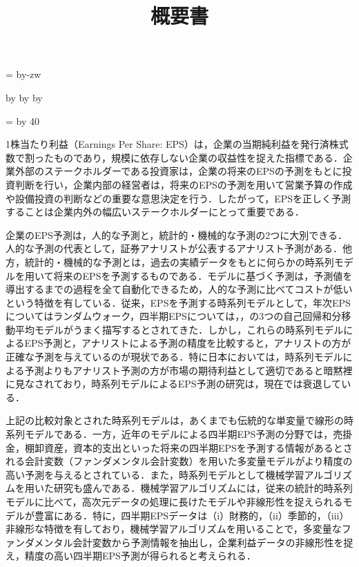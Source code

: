 \documentclass[a4paper，11pt]{jsarticle}
\title{概要書}
\date{}
\makeatletter
\def\mojiparline#1{
    \newcounter{mpl}
    \setcounter{mpl}{#1}
    \@tempdima=\linewidth
    \advance\@tempdima by-\value{mpl}zw
    \addtocounter{mpl}{-1}
    \divide\@tempdima by \value{mpl}
    \advance\kanjiskip by\@tempdima
    \advance\parindent by\@tempdima
}
\def\linesparpage#1{
    \baselineskip=\textheight
    \divide\baselineskip by #1
}
\makeatother
\begin{document}
\mojiparline{35}
\linesparpage{40}

\pagestyle{empty}

\maketitle


1株当たり利益（Earnings Per Share: EPS）は，企業の当期純利益を発行済株式数で割ったものであり，規模に依存しない企業の収益性を捉えた指標である．企業外部のステークホルダーである投資家は，企業の将来のEPSの予測をもとに投資判断を行い，企業内部の経営者は，将来のEPSの予測を用いて営業予算の作成や設備投資の判断などの重要な意思決定を行う．したがって，EPSを正しく予測することは企業内外の幅広いステークホルダーにとって重要である．

企業のEPS予測は，人的な予測と，統計的・機械的な予測の2つに大別できる．人的な予測の代表として，証券アナリストが公表するアナリスト予測がある．他方，統計的・機械的な予測とは，過去の実績データをもとに何らかの時系列モデルを用いて将来のEPSを予測するものである．モデルに基づく予測は，予測値を導出するまでの過程を全て自動化できるため，人的な予測に比べてコストが低いという特徴を有している．従来，EPSを予測する時系列モデルとして，年次EPSについてはランダムウォーク，四半期EPSについては\cite*{brown1979univariate}，\cite{griffin1977time}，\cite{foster1977quarterly}の3つの自己回帰和分移動平均モデルがうまく描写するとされてきた．しかし，これらの時系列モデルによるEPS予測と，アナリストによる予測の精度を比較すると，アナリストの方が正確な予測を与えているのが現状である\citep{sakurai1990}．特に日本においては，時系列モデルによる予測よりもアナリスト予測の方が市場の期待利益として適切であると暗黙裡に見なされており，時系列モデルによるEPS予測の研究は，現在では衰退している\citep{ota2006}．

上記の比較対象とされた時系列モデルは，あくまでも伝統的な単変量で線形の時系列モデルである．一方，近年のモデルによる四半期EPS予測の分野では，売掛金，棚卸資産，資本的支出といった将来の四半期EPSを予測する情報があるとされる会計変数（ファンダメンタル会計変数）を用いた多変量モデルがより精度の高い予測を与えるとされている．また，時系列モデルとして機械学習アルゴリズムを用いた研究も盛んである．機械学習アルゴリズムには，従来の統計的時系列モデルに比べて，高次元データの処理に長けたモデルや非線形性を捉えられるモデルが豊富にある\citep*{cao2020fundamental}．特に，四半期EPSデータは（i）財務的，（ii）季節的，（iii）非線形な特徴を有しており\citep{hill1994artificial}，機械学習アルゴリズムを用いることで，多変量なファンダメンタル会計変数から予測情報を抽出し，企業利益データの非線形性を捉え，精度の高い四半期EPS予測が得られると考えられる．
\end{document}
